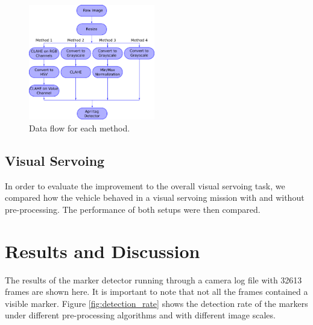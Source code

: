 \documentclass[conference, letterpaper]{IEEEtran}
\begin{document}
\begin{figure}[!htpb]
    \centering
    \includegraphics[width=0.49\textwidth]{./fig/processing_flow3.png}
    \caption{Data flow for each method.}
    \label{fig:methods_flow}
\end{figure}


\subsection{Visual Servoing}

In order to evaluate the improvement to the overall visual servoing
task, we compared how the vehicle behaved in a visual servoing mission with and
without pre-processing. The performance of both setups were then compared.

\section{Results and Discussion} \label{sec:results}

The results of the marker detector running through a camera log file with 32613
frames are shown here. It is important to note that not all the frames
contained a visible marker. Figure \ref{fig:detection_rate} shows the detection
rate of the markers under different pre-processing algorithms and with
different image scales. 
\end{document}
